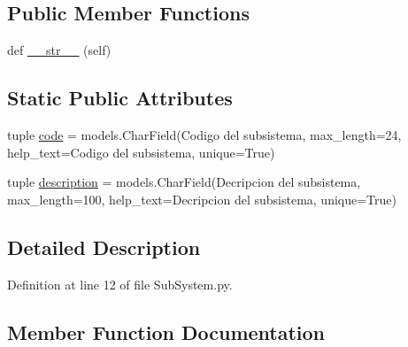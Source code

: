 \subsection*{Public Member Functions}
\begin{DoxyCompactItemize}
\item 
def \hyperlink{class_ground_segment_1_1models_1_1_sub_system_1_1_sub_system_abfa62a78e8946e0c258c868dca3b4791}{\+\_\+\+\_\+str\+\_\+\+\_\+} (self)
\end{DoxyCompactItemize}
\subsection*{Static Public Attributes}
\begin{DoxyCompactItemize}
\item 
tuple \hyperlink{class_ground_segment_1_1models_1_1_sub_system_1_1_sub_system_a64280dfdb7f44136c773e51f5e081a74}{code} = models.\+Char\+Field(\textquotesingle{}Codigo del subsistema\textquotesingle{}, max\+\_\+length=24, help\+\_\+text=\textquotesingle{}Codigo del subsistema\textquotesingle{}, unique=True)
\item 
tuple \hyperlink{class_ground_segment_1_1models_1_1_sub_system_1_1_sub_system_a7b91c7100b903a2c56f18edef6cdfd00}{description} = models.\+Char\+Field(\textquotesingle{}Decripcion del subsistema\textquotesingle{}, max\+\_\+length=100, help\+\_\+text=\textquotesingle{}Decripcion del subsistema\textquotesingle{}, unique=True)
\end{DoxyCompactItemize}


\subsection{Detailed Description}


Definition at line 12 of file Sub\+System.\+py.



\subsection{Member Function Documentation}
\hypertarget{class_ground_segment_1_1models_1_1_sub_system_1_1_sub_system_abfa62a78e8946e0c258c868dca3b4791}{}
